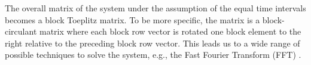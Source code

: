 The overall matrix of the system under the assumption of the equal time intervals becomes a block Toeplitz matrix. To be more specific, the matrix is a block-circulant matrix where each block row vector is rotated one block element to the right relative to the preceding block row vector. This leads us to a wide range of possible techniques to solve the system, e.g., the Fast Fourier Transform (FFT) \cite{mazancourt1983, vescovo1997}.
